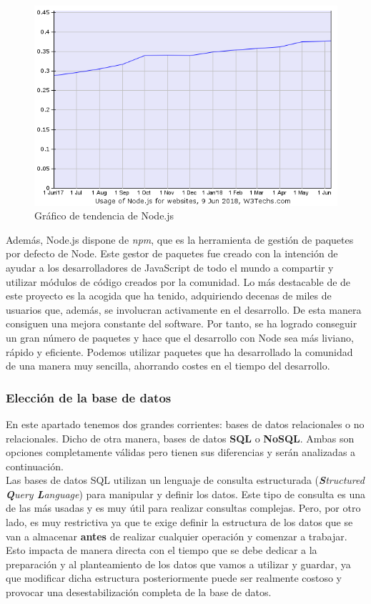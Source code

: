 \begin{figure}[H]
	\centering
	\includegraphics[scale=0.65]{imagenes/nodejs-trend.png}
	\caption{Gráfico de tendencia de Node.js \cite{nodejs-trend} \label{fig:figura4}}
\end{figure}

Además, Node.js dispone de \textit{npm}\cite{npm}, que es la herramienta de gestión de paquetes por defecto de Node. Este
gestor de paquetes fue creado con la intención de ayudar a los desarrolladores de JavaScript  de todo el mundo a compartir y utilizar
módulos de código creados por la comunidad. Lo más destacable de
de este proyecto es la acogida que ha tenido, adquiriendo decenas de miles de usuarios que, además, se involucran
activamente en el desarrollo. De esta manera consiguen una mejora constante del software. Por tanto, se ha logrado conseguir
un gran número de paquetes y hace que el desarrollo con Node sea más liviano, rápido y eficiente. Podemos utilizar paquetes que 
ha desarrollado la comunidad de una manera muy sencilla, ahorrando costes en el tiempo del desarrollo.


\subsubsection{Elección de la base de datos}

En este apartado tenemos dos grandes corrientes: bases de datos relacionales o no relacionales. Dicho de otra manera,
bases de datos \textbf{SQL} o \textbf{NoSQL}. Ambas son opciones completamente válidas pero tienen sus diferencias y serán analizadas a continuación.\\

Las bases de datos SQL utilizan un lenguaje de consulta estructurada (\textit{\textbf{S}tructured \textbf{Q}uery \textbf{L}anguage}) para manipular
y definir los datos. Este tipo de consulta es una de las más usadas y es muy útil para realizar consultas complejas. 
Pero, por otro lado, es muy restrictiva ya que te exige definir la estructura de los datos que se van a almacenar \textbf{antes} 
de realizar cualquier operación y comenzar a trabajar. Esto impacta de manera directa con el tiempo que se debe dedicar a 
la preparación y al planteamiento de los datos que vamos a utilizar y guardar, ya que modificar dicha estructura posteriormente
puede ser realmente costoso y provocar una desestabilización completa de la base de datos.\\

